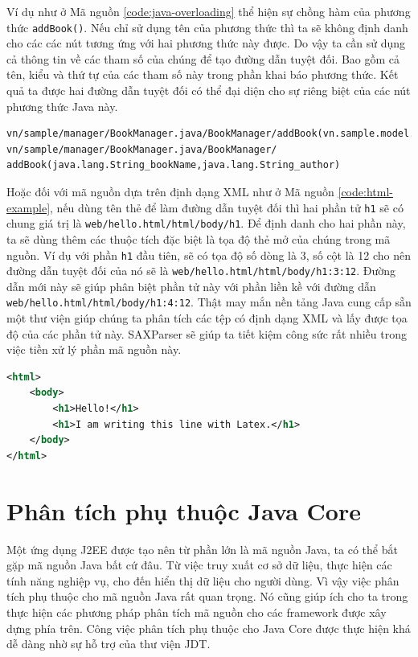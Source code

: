 \documentclass[12pt,a4paper]{report}
\begin{document}
Ví dụ như ở Mã nguồn \ref{code:java-overloading} thể hiện sự chồng hàm của phương thức \texttt{addBook()}. Nếu chỉ sử dụng tên của phương thức thì ta sẽ không định danh cho các các nút tương ứng với hai phương thức này được. Do vậy ta cần sử dụng cả thông tin về các tham số của chúng để tạo đường dẫn tuyệt đối. Bao gồm cả tên, kiểu và thứ tự của các tham số này trong phần khai báo phương thức. Kết quả ta được hai đường dẫn tuyệt đối có thể đại diện cho sự riêng biệt của các nút phương thức Java này.

\begin{verbatim}
vn/sample/manager/BookManager.java/BookManager/addBook(vn.sample.model.Book_newBook)
vn/sample/manager/BookManager.java/BookManager/
addBook(java.lang.String_bookName,java.lang.String_author)
\end{verbatim}

Hoặc đối với mã nguồn dựa trên định dạng XML như ở Mã nguồn \ref{code:html-example}, nếu dùng tên thẻ để làm đường dẫn tuyệt đối thì hai phần tử \texttt{h1} sẽ có chung giá trị là \texttt{web/hello.html/html/body/h1}. Để định danh cho hai phần này, ta sẽ dùng thêm các thuộc tích đặc biệt là tọa độ thẻ mở của chúng trong mã nguồn. Ví dụ với phần \texttt{h1} đầu tiên, sẽ có tọa độ số dòng là 3, số cột là 12 cho nên đường dẫn tuyệt đối của nó sẽ là \texttt{web/hello.html/html/body/h1:3:12}. Đường dẫn mới này sẽ giúp phân biệt phần tử này với phần liền kề với đường dẫn \texttt{web/hello.html/html/body/h1:4:12}. Thật may mắn nền tảng Java cung cấp sẵn một thư viện giúp chúng ta phân tích các tệp có định dạng XML và lấy được tọa độ của các phần tử này. SAXParser sẽ giúp ta tiết kiệm công sức rất nhiều trong việc tiền xử lý phần mã nguồn này.\\

\begin{lstlisting}[language=XML,
caption={Ví dụ mã nguồn HTML},label={code:html-example}]
<html>
	<body>
		<h1>Hello!</h1>
		<h1>I am writing this line with Latex.</h1>
	</body>
</html>
\end{lstlisting}

\section{Phân tích phụ thuộc Java Core}
Một ứng dụng J2EE được tạo nên từ phần lớn là mã nguồn Java, ta có thể bắt gặp mã nguồn Java bất cứ đâu. Từ việc truy xuất cơ sở dữ liệu, thực hiện các tính năng nghiệp vụ, cho đến hiển thị dữ liệu cho người dùng. Vì vậy việc phân tích phụ thuộc cho mã nguồn Java rất quan trọng. Nó cũng giúp ích cho ta trong thực hiện các phương pháp phân tích mã nguồn cho các framework được xây dựng phía trên. Công việc phân tích phụ thuộc cho Java Core được thực hiện khá dễ dàng nhờ sự hỗ trợ của thư viện JDT.\\
\end{document}

